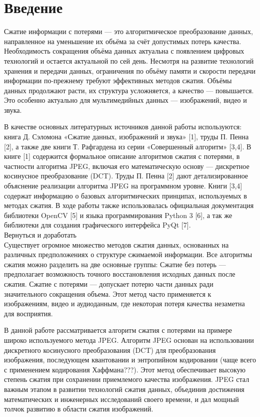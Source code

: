 \section*{Введение}

Сжатие информации с потерями — это алгоритмическое преобразование данных, направленное на уменьшение их объёма за счёт допустимых потерь качества. 
Необходимость сокращения объёма данных актуальна с появлением цифровых технологий и остается актуальной по сей день. 
Несмотря на развитие технологий хранения и передачи данных, ограничения по объёму памяти и скорости передачи информации по-прежнему требуют эффективных методов сжатия. 
Объёмы данных продолжают расти, их структура усложняется, а качество — повышается. 
Это особенно актуально для мультимедийных данных — изображений, видео и звука.

В качестве основных литературных источников данной работы используются: книга Д. Сэломона «Сжатие данных, изображений и звука» [1], труды П. Пенна [2], а также две книги Т. Рафгардена из серии «Совершенный алгоритм» [3,4]. 
В книге [1] содержится формальное описание алгоритмов сжатия с потерями, в частности алгоритма JPEG, включая его математическую основу — дискретное косинусное преобразование (DCT). 
Труды П. Пенна [2] дают детализированное объяснение реализации алгоритма JPEG на программном уровне. 
Книги [3,4] содержат информацию о базовых алгоритмических принципах, используемых в методах сжатия. 
В ходе работы также использовалась официальная документация библиотеки OpenCV [5] и языка программирования Python 3 [6], а так же библиотеки для создания графического интерфейса PyQt [7].
\\

Вернуться и доработать\\

Существует огромное множество методов сжатия данных, основанных на различных предположениях о структуре сжимаемой информации. 
Все алгоритмы сжатия можно разделить на две основные группы:
Сжатие без потерь — предполагает возможность точного восстановления исходных данных после сжатия.
Сжатие с потерями — допускает потерю части данных ради значительного сокращения объема. 
Этот метод часто применяется к изображениям, видео и аудиоданным, где некоторая потеря качества незаметна для восприятия.

В данной работе рассматривается алгоритм сжатия с потерями на примере широко используемого метода JPEG. 
Алгоритм JPEG основан на использовании дискретного косинусного преобразования (DCT) для преобразования изображения, последующем квантовании и энтропийном кодировании (чаще всего с применением кодирования Хаффмана???). 
Этот метод обеспечивает высокую степень сжатия при сохранении приемлемого качества изображения. 
JPEG стал важным этапом в развитии технологий сжатия данных, объединив достижения математических и инженерных исследований своего времени, и дал мощный толчок развитию в области сжатия изображений.

